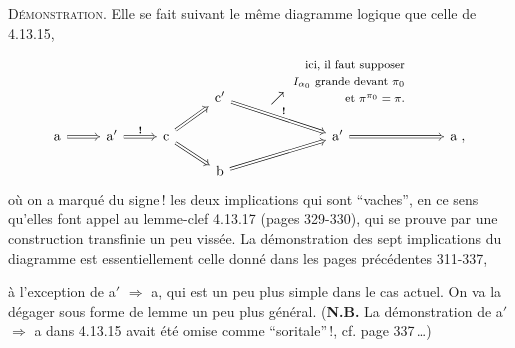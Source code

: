 \textsc{Démonstration}. Elle se fait suivant le même diagramme logique que celle de 4.13.15,
\[
\begin{tikzcd}[row sep=small]
& & & \mathrm{c}' \arrow[dr, Rightarrow, "\textbf{!}"] & \nearrow\ \begin{tabular}[b]{@{}r@{}}\footnotesize ici, il faut supposer\\ \footnotesize $I_{\alpha_0}$ grande devant $\pi_0$\\ \footnotesize et $\pi^{\pi_0} = \pi$.\end{tabular} & \\
\mathrm{a} \arrow[r, Rightarrow] & \mathrm{a}' \arrow[r, Rightarrow, "\textbf{!}"] & \mathrm{c} \arrow[ur, Rightarrow] \arrow[dr, Rightarrow] & & \mathrm{a}' \arrow[r, Rightarrow] & \mathrm{a} \; , \\
& & & \mathrm{b} \arrow[ur, Rightarrow] & &
\end{tikzcd}
\]
où on a marqué du signe\,! les deux implications qui sont ``vaches'', en ce sens qu'elles font appel au lemme-clef 4.13.17 (pages 329-330), qui se prouve par une construction transfinie un peu vissée. La démonstration des sept implications du diagramme est essentiellement
celle donné dans les pages précédentes 311-337, %

\setcounter{footnote}{143}


à l'exception de a$'$ $\Longrightarrow$ a, qui est un peu plus simple dans le cas actuel. On va la dégager sous forme de lemme un peu plus général. (\textbf{N.B.} La démonstration de a$'$ $\Longrightarrow$ a dans 4.13.15 avait été omise comme “soritale”\,!, cf. page 337\,\dots)

